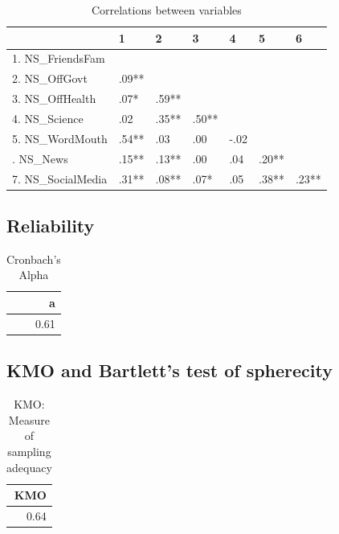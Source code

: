 \documentclass[]{article}
\begin{document}
\begin{table}[H]

\caption{\label{tab:unnamed-chunk-42}Correlations between variables}
\centering
\fontsize{6}{8}\selectfont
\begin{tabular}[t]{lllllll}
\toprule
  & 1 & 2 & 3 & 4 & 5 & 6\\
\midrule
1. NS\_FriendsFam &  &  &  &  &  & \\
2. NS\_OffGovt & .09** &  &  &  &  & \\
3. NS\_OffHealth & .07* & .59** &  &  &  & \\
4. NS\_Science & .02 & .35** & .50** &  &  & \\
5. NS\_WordMouth & .54** & .03 & .00 & -.02 &  & \\
\addlinespace
6. NS\_News & .15** & .13** & .00 & .04 & .20** & \\
7. NS\_SocialMedia & .31** & .08** & .07* & .05 & .38** & .23**\\
\bottomrule
\end{tabular}
\end{table}

\hypertarget{reliability-7}{%
\subsection{Reliability}\label{reliability-7}}

\begin{table}[H]

\caption{\label{tab:unnamed-chunk-43}Cronbach's Alpha}
\centering
\fontsize{6}{8}\selectfont
\begin{tabular}[t]{r}
\toprule
a\\
\midrule
0.61\\
\bottomrule
\end{tabular}
\end{table}

\hypertarget{kmo-and-bartletts-test-of-spherecity-8}{%
\subsection{KMO and Bartlett's test of
spherecity}\label{kmo-and-bartletts-test-of-spherecity-8}}

\begin{table}[H]

\caption{\label{tab:unnamed-chunk-44}KMO: Measure of sampling adequacy}
\centering
\fontsize{6}{8}\selectfont
\begin{tabular}[t]{r}
\toprule
KMO\\
\midrule
0.64\\
\bottomrule
\end{tabular}
\end{table}
\end{document}
